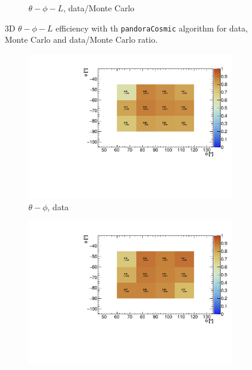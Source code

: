 \documentclass[a4paper]{scrartcl}
\begin{document}
\begin{figure}[htbp]
\begin{center}
\begin{subfigure}{0.52\textwidth}
\caption{$\theta - \phi - L$, data/Monte Carlo}\label{fig:3d_cry_ratio}
\end{subfigure}
\caption{3D $\theta - \phi - L$ efficiency with th \texttt{pandoraCosmic} algorithm for data, Monte Carlo and data/Monte Carlo ratio.} \label{fig:cry_mc_3d}
\end{center}
\end{figure}

\begin{figure}[htbp]
\begin{center}
\begin{subfigure}{0.52\textwidth}
\includegraphics[width=\linewidth]{theta_phi_data.pdf}
\caption{$\theta - \phi$, data} \label{fig:2d_cry}
\end{subfigure}\begin{subfigure}{0.52\textwidth}
\includegraphics[width=\linewidth]{theta_phi_mc.pdf}

\end{subfigure}
\end{center}
\end{figure}
\end{document}
